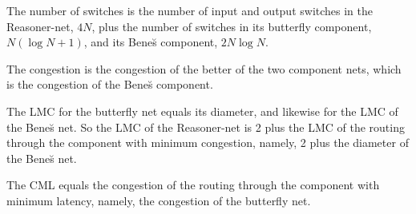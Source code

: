 \documentclass[12pt,twoside]{article}
\begin{document}
\begin{problem}{20}
{The number of switches is the number of input and output switches in the
Reasoner-net, $4N$, plus the number of switches in its butterfly
component, $N (\log N + 1)$, and its Bene\u{s} component, $2N \log N$.

The congestion is the congestion of the better of the two component nets, which is the congestion of the Bene\u{s} component.

The LMC for the butterfly net equals its diameter, and likewise for the LMC
of the Bene\u{s} net.  So the LMC of the Reasoner-net is 2 plus the LMC of
the routing through the component with minimum congestion, namely, 2 plus
the diameter of the Bene\u{s} net.

The CML equals the congestion of the routing through the component
with minimum latency, namely, the congestion of the butterfly net.}
\end{problem}



\end{document}

